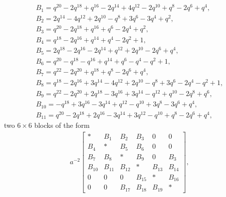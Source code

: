 \documentclass[10pt,a4paper]{amsart}
\numberwithin{equation}{section}
\theoremstyle{definition}
\newcommand{\flac}[2]{#1}
\begin{document}
\begin{gather*}
 B_1 =
\flac{q^{20}}{a^2}-\flac{2q^{18}}{a^2}+\flac{q^{16}}{a^2}-\flac{2q^{14}}{a^2}+\flac{4q^{12}}{a^2}-\flac{2q^{10}}{a^2}+\flac{q^{8}}{a^2}-\flac{2q^{6}}{a^2}+\flac{q^{4}}{a^2},\\
 B_2 =
\flac{2q^{14}}{a^2}-\flac{4q^{12}}{a^2}+\flac{2q^{10}}{a^2}-\flac{q^{8}}{a^2}+\flac{3q^{6}}{a^2}-\flac{3q^{4}}{a^2}+\flac{q^{2}}{a^2}, \\
 B_3 =
\flac{q^{20}}{a^2}-\flac{2q^{18}}{a^2}+\flac{q^{16}}{a^2}+\flac{q^{6}}{a^2}-\flac{2q^{4}}{a^2}+\flac{q^{2}}{a^2}, \\
 B_4 =
\flac{q^{18}}{a^2}-\flac{2q^{16}}{a^2}+\flac{q^{14}}{a^2}+\flac{q^{4}}{a^2}-\flac{2q^{2}}{a^2}+\flac{1}{a^2}, \\
 B_5 =
\flac{2q^{18}}{a^2}-\flac{2q^{16}}{a^2}-\flac{2q^{14}}{a^2}+\flac{q^{12}}{a^2}+\flac{2q^{10}}{a^2}-\flac{2q^{6}}{a^2}+\flac{q^{4}}{a^2}, \\
 B_6 =
\flac{q^{20}}{a^2}-\flac{q^{18}}{a^2}-\flac{q^{16}}{a^2}+\flac{q^{14}}{a^2}+\flac{q^{6}}{a^2}-\flac{q^{4}}{a^2}-\flac{q^{2}}{a^2}+\flac{1}{a^2}, \\
 B_7 =
\flac{q^{22}}{a^2}-\flac{2q^{20}}{a^2}+\flac{q^{18}}{a^2}+\flac{q^{8}}{a^2}-\flac{2q^{6}}{a^2}+\flac{q^{4}}{a^2}, \\
 B_8 =
\flac{q^{18}}{a^2}-\flac{2q^{16}}{a^2}+\flac{3q^{14}}{a^2}-\flac{4q^{12}}{a^2}+\flac{2q^{10}}{a^2}-\flac{q^{8}}{a^2}+\flac{3q^{6}}{a^2}-\flac{2q^{4}}{a^2}-\flac{q^{2}}{a^2}+\flac{1}{a^2}, \\
 B_9 =
\flac{q^{22}}{a^2}-\flac{2q^{20}}{a^2}+\flac{2q^{18}}{a^2}-\flac{3q^{16}}{a^2}+\flac{3q^{14}}{a^2}-\flac{q^{12}}{a^2}+\flac{q^{10}}{a^2}-\flac{2q^{8}}{a^2}+\flac{q^{6}}{a^2}, \\
 B_{10} =
-\flac{q^{18}}{a^2}+\flac{3q^{16}}{a^2}-\flac{3q^{14}}{a^2}+\flac{q^{12}}{a^2}-\flac{q^{10}}{a^2}+\flac{3q^{8}}{a^2}-\flac{3q^{6}}{a^2}+\flac{q^{4}}{a^2}, \\
 B_{11} =
\flac{q^{20}}{a^2}-\flac{2q^{18}}{a^2}+\flac{2q^{16}}{a^2}-\flac{3q^{14}}{a^2}+\flac{3q^{12}}{a^2}-\flac{q^{10}}{a^2}+\flac{q^{8}}{a^2}-\flac{2q^{6}}{a^2}+\flac{q^{4}}{a^2},
\end{gather*}
two $6 \times 6$ blocks of the form
\begin{align*}
 a^{-2} \begin{bmatrix}
 * & B_1 & B_2 & B_3 & 0 & 0 \\
 B_4 & * & B_5 & B_6 & 0 & 0 \\
 B_7 & B_8 & * & B_9 & 0 & B_3 \\
 B_{10} & B_{11} & B_{12} & * & B_{13} & B_{14} \\
 0 & 0 & 0 & B_{15} & * & B_{16} \\
 0 & 0 & B_{17} & B_{18} & B_{19} & *
 \end{bmatrix},
\end{align*}
\end{document}
